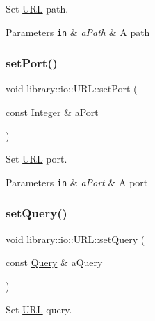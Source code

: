 Set \hyperlink{classlibrary_1_1io_1_1_u_r_l}{U\+RL} path. 


\begin{DoxyParams}[1]{Parameters}
\mbox{\tt in}  & {\em a\+Path} & A path \\
\hline
\end{DoxyParams}
\mbox{\label{classlibrary_1_1io_1_1_u_r_l_ae2be028e95ac8a5d50735e090619fce2}} 
\subsubsection{\texorpdfstring{set\+Port()}{setPort()}}
{\footnotesize\ttfamily void library\+::io\+::\+U\+R\+L\+::set\+Port (\begin{DoxyParamCaption}\item[{const \hyperlink{namespacelibrary_1_1io_a0a929bf9e177597c2e92073d200dda53}{Integer} \&}]{a\+Port }\end{DoxyParamCaption})}



Set \hyperlink{classlibrary_1_1io_1_1_u_r_l}{U\+RL} port. 


\begin{DoxyParams}[1]{Parameters}
\mbox{\tt in}  & {\em a\+Port} & A port \\
\hline
\end{DoxyParams}
\mbox{\label{classlibrary_1_1io_1_1_u_r_l_aaff5008a336303ac208f97fbb33d0e94}} 
\subsubsection{\texorpdfstring{set\+Query()}{setQuery()}}
{\footnotesize\ttfamily void library\+::io\+::\+U\+R\+L\+::set\+Query (\begin{DoxyParamCaption}\item[{const \hyperlink{namespacelibrary_1_1io_a39ebaf2265de78ba79eb5347f2af61b3}{Query} \&}]{a\+Query }\end{DoxyParamCaption})}



Set \hyperlink{classlibrary_1_1io_1_1_u_r_l}{U\+RL} query. 



